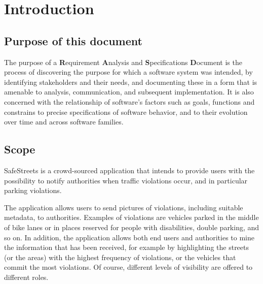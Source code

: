 \section{Introduction}
\subsection{Purpose of this document}
The purpose of a \textbf{R}equirement \textbf{A}nalysis and \textbf{S}pecifications \textbf{D}ocument is the process of discovering the purpose for which a software system was intended, by identifying stakeholders and their needs, and documenting these in a form that is amenable to analysis, communication, and subsequent implementation. \cite{RE} It is also concerned with the relationship of software's factors such as goals, functions and constrains to precise specifications of software behavior, and to their evolution over time and across software families.\cite{Zave}

\subsection{Scope}

SafeStreets is a crowd-­sourced application that intends to provide users with the possibility to notify authorities when traffic violations occur, and in particular parking violations. 

The application allows users to send pictures of violations, including suitable metadata, to authorities. Examples of violations are vehicles parked in the middle of bike lanes or in places reserved for people with disabilities, double parking, and so on. In addition, the application allows both end users and authorities to mine the information that has been received, for example by highlighting the streets (or the areas) with the highest frequency of violations, or the vehicles that commit the most violations. Of course, different levels of visibility are offered to different roles.\cite{Assignments}

